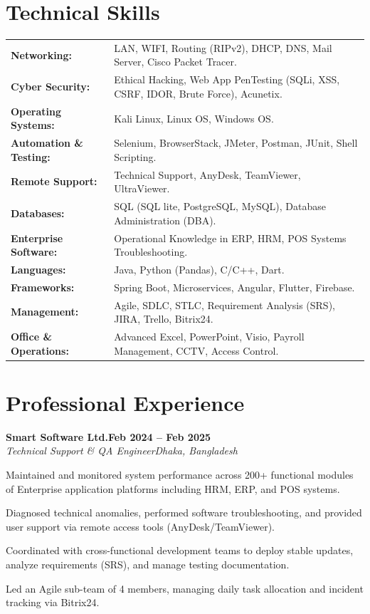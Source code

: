 \documentclass[letterpaper,10pt]{article}
\newcommand{\heading}[2]{\hspace{10pt}#1\hfill#2\\}
\newcommand{\headingBf}[2]{\heading{\textbf{#1}}{\textbf{#2}}}
\newcommand{\headingIt}[2]{\heading{\textit{#1}}{\textit{#2}}}
\newenvironment{resume_list}{
  \vspace{-7pt}
  \begin{itemize}[itemsep=-2px, parsep=1pt, leftmargin=30pt]
}{
  \end{itemize}
}
\begin{document}
\section{Technical Skills}
\begin{tabular}{@{}p{3.8cm}p{15.2cm}@{}}
\textbf{Networking:} & LAN, WIFI, Routing (RIPv2), DHCP, DNS, Mail Server, Cisco Packet Tracer. \\
\textbf{Cyber Security:} & Ethical Hacking, Web App PenTesting (SQLi, XSS, CSRF, IDOR, Brute Force), Acunetix. \\
\textbf{Operating Systems:} & Kali Linux, Linux OS, Windows OS. \\
\textbf{Automation \& Testing:} & Selenium, BrowserStack, JMeter, Postman, JUnit, Shell Scripting. \\
\textbf{Remote Support:} & Technical Support, AnyDesk, TeamViewer, UltraViewer. \\
\textbf{Databases:} & SQL (SQL lite, PostgreSQL, MySQL), Database Administration (DBA). \\
\textbf{Enterprise Software:} & Operational Knowledge in ERP, HRM, POS Systems Troubleshooting. \\
\textbf{Languages:} & Java, Python (Pandas), C/C++, Dart. \\
\textbf{Frameworks:} & Spring Boot, Microservices, Angular, Flutter, Firebase. \\
\textbf{Management:} & Agile, SDLC, STLC, Requirement Analysis (SRS), JIRA, Trello, Bitrix24. \\
\textbf{Office \& Operations:} & Advanced Excel, PowerPoint, Visio, Payroll Management, CCTV, Access Control. \\
\end{tabular}

\section{Professional Experience}

\headingBf{Smart Software Ltd.}{Feb 2024 -- Feb 2025}
\headingIt{Technical Support \& QA Engineer}{Dhaka, Bangladesh}
\begin{resume_list}
  \item Maintained and monitored system performance across 200+ functional modules of Enterprise application platforms including HRM, ERP, and POS systems.
  \item Diagnosed technical anomalies, performed software troubleshooting, and provided user support via remote access tools (AnyDesk/TeamViewer).
  \item Coordinated with cross-functional development teams to deploy stable updates, analyze requirements (SRS), and manage testing documentation.
  \item Led an Agile sub-team of 4 members, managing daily task allocation and incident tracking via Bitrix24.
\end{resume_list}
\end{document}
